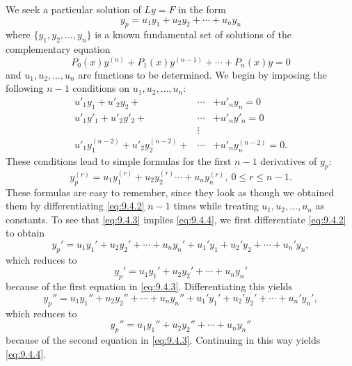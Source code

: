 \documentclass{ximera}
\begin{document}
We seek a particular solution of $Ly=F$ in the form
\begin{equation} \label{eq:9.4.2}
y_p=u_1y_1+u_2y_2+\cdots+u_ny_n
\end{equation}
where $\{y_1,y_2,\dots,y_n\}$ is a known fundamental set of solutions
of the complementary equation
$$
P_0(x)y^{(n)}+P_1(x)y^{(n-1)}+\cdots+P_n(x)y=0
$$
and $u_1, u_2, \dots, u_n$ are functions to be determined. We begin by
imposing the following $n-1$ conditions on $u_1,u_2,\dots,u_n$:
\begin{equation} \label{eq:9.4.3}
\begin{array}{rcl}
u'_1y_1+u'_2y_2+&\cdots&+u'_ny_n=0 \\
u'_1y'_1+u'_2y'_2+&\cdots&+u'_ny'_n=0 \\
&\vdots& \\
u'_1y_1^{(n-2)}+u'_2y^{(n-2)}_2+&\cdots&+u'_ny^{(n-2)}_n
=0.
\end{array}
\end{equation}
These conditions lead to simple formulas for the first $n-1$
derivatives of $y_p$:
\begin{equation} \label{eq:9.4.4}
y^{(r)}_p=u_1y^{(r)}_1+u_2y_2^{(r)}\cdots+u_ny^{(r)}_n,\ 0
\leq r \leq n-1.
\end{equation}
These formulas are easy to remember, since they look as though we
obtained them by differentiating \eqref{eq:9.4.2} $n-1$ times while
treating $u_1, u_2, \dots, u_n$ as constants. To see that
\eqref{eq:9.4.3}
implies \eqref{eq:9.4.4}, we first differentiate \eqref{eq:9.4.2} to obtain
$$
y_p'=u_1y_1'+u_2y_2'+\cdots+u_ny_n'+u_1'y_1+u_2'y_2+\cdots+u_n'y_n,
$$
which  reduces to
$$
y_p'=u_1y_1'+u_2y_2'+\cdots+u_ny_n'
$$
because of the first equation in \eqref{eq:9.4.3}. Differentiating this
yields
$$
y_p''=u_1y_1''+u_2y_2''+\cdots+u_ny_n''+u_1'y_1'+u_2'y_2'+\cdots+u_n'y_n',
$$
which reduces to
$$
y_p''=u_1y_1''+u_2y_2''+\cdots+u_ny_n''
$$
because of  the second equation in \eqref{eq:9.4.3}.
Continuing in this way yields \eqref{eq:9.4.4}.
\end{document}
